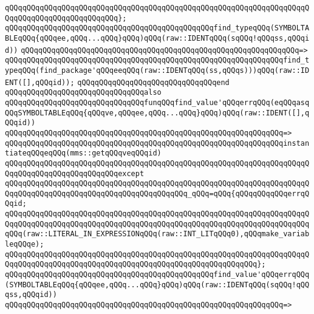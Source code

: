 \verb|qQQqqQQqqQQqqQQqqQQqqQQqqQQqqQQqqQQqqQQqqQQqqQQqqQQqqQQqqQQqqQQqqQQqqQQqqQQqqQQqqQQqqQQqqQQqqQQq};|\newline
\newline
\verb|qQQqqQQqqQQqqQQqqQQqqQQqqQQqqQQqqQQqqQQqqQQqqQQqfind_typeqQQq(SYMBOLTABLEqQQq{qQQqee,qQQq...qQQq}qQQq)qQQq(raw::IDENTqQQq(sqQQq!qQQqss,qQQqid))|\newline
\verb|qQQqqQQqqQQqqQQqqQQqqQQqqQQqqQQqqQQqqQQqqQQqqQQqqQQqqQQqqQQqqQQq=>|\newline
\verb|qQQqqQQqqQQqqQQqqQQqqQQqqQQqqQQqqQQqqQQqqQQqqQQqqQQqqQQqqQQqqQQqfind_typeqQQq(find_package'qQQqeeqQQq(raw::IDENTqQQq(ss,qQQqs)))qQQq(raw::IDENT([],qQQqid));|\newline
\verb|qQQqqQQqqQQqqQQqqQQqqQQqqQQqqQQqend|\newline
\newline
\verb|qQQqqQQqqQQqqQQqqQQqqQQqqQQqqQQqalso|\newline
\verb|qQQqqQQqqQQqqQQqqQQqqQQqqQQqqQQqfunqQQqfind_value'qQQqerrqQQq(eqQQqasqQQqSYMBOLTABLEqQQq{qQQqve,qQQqee,qQQq...qQQq}qQQq)qQQq(raw::IDENT([],qQQqid))|\newline
\verb|qQQqqQQqqQQqqQQqqQQqqQQqqQQqqQQqqQQqqQQqqQQqqQQqqQQqqQQqqQQqqQQq=>|\newline
\verb|qQQqqQQqqQQqqQQqqQQqqQQqqQQqqQQqqQQqqQQqqQQqqQQqqQQqqQQqqQQqqQQqinstantiateqQQqeqQQq(mms::getqQQqveqQQqid)|\newline
\verb|qQQqqQQqqQQqqQQqqQQqqQQqqQQqqQQqqQQqqQQqqQQqqQQqqQQqqQQqqQQqqQQqqQQqqQQqqQQqqQQqqQQqqQQqqQQqqQQqexcept|\newline
\verb|qQQqqQQqqQQqqQQqqQQqqQQqqQQqqQQqqQQqqQQqqQQqqQQqqQQqqQQqqQQqqQQqqQQqqQQqqQQqqQQqqQQqqQQqqQQqqQQqqQQqqQQqqQQqqQQq_qQQq=qQQq{qQQqqQQqqQQqerrqQQqid;|\newline
\verb|qQQqqQQqqQQqqQQqqQQqqQQqqQQqqQQqqQQqqQQqqQQqqQQqqQQqqQQqqQQqqQQqqQQqqQQqqQQqqQQqqQQqqQQqqQQqqQQqqQQqqQQqqQQqqQQqqQQqqQQqqQQqqQQqqQQqqQQqqQQqqQQq(raw::LITERAL_IN_EXPRESSIONqQQq(raw::INT_LITqQQq0),qQQqmake_variableqQQqe);|\newline
\verb|qQQqqQQqqQQqqQQqqQQqqQQqqQQqqQQqqQQqqQQqqQQqqQQqqQQqqQQqqQQqqQQqqQQqqQQqqQQqqQQqqQQqqQQqqQQqqQQqqQQqqQQqqQQqqQQqqQQqqQQqqQQqqQQq};|\newline
\newline
\verb|qQQqqQQqqQQqqQQqqQQqqQQqqQQqqQQqqQQqqQQqqQQqqQQqfind_value'qQQqerrqQQq(SYMBOLTABLEqQQq{qQQqee,qQQq...qQQq}qQQq)qQQq(raw::IDENTqQQq(sqQQq!qQQqss,qQQqid))|\newline
\verb|qQQqqQQqqQQqqQQqqQQqqQQqqQQqqQQqqQQqqQQqqQQqqQQqqQQqqQQqqQQqqQQq=>|\newline
